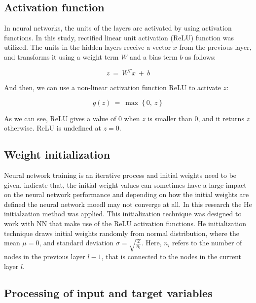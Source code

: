 \documentclass[a4paper, twoside]{templates/ociamthesis}
\begin{document}
\hypertarget{activation-function}{%
\subsection{Activation function}\label{activation-function}}

In neural networks, the units of the layers are activated by using activation functions. In this study, rectified linear unit activation (ReLU) function was utilized. The units in the hidden layers receive a vector \(x\) from the previous layer, and transforms it using a weight term \(W\) and a bias term \(b\) as follows:

\begin{equation}
z\ =\ W^Tx\ +\ b
\label{eq:z}
\end{equation}

And then, we can use a non-linear activation function ReLU to activate \(z\):

\begin{equation}
g\left(z\right)\ =\ \max\left\{0,\ z\right\}
\label{eq:relu}
\end{equation}

As we can see, ReLU gives a value of 0 when \(z\) is smaller than 0, and it returns \(z\) otherwise. ReLU is undefined at \(z = 0\).

\hypertarget{weight-initialization}{%
\subsection{Weight initialization}\label{weight-initialization}}

Neural network training is an iterative process and initial weights need to be given. \citet{goodfellow2016deep} indicate that, the initial weight values can sometimes have a large impact on the neural network performance and depending on how the initial weights are defined the neural network moedl may not converge at all. In this research the He initialzation \citep{he2015delving} method was applied. This initialization technique was designed to work with NN that make use of the ReLU activation functions. He initialization technique draws initial weights randomly from normal distribution, where the mean \(\mu = 0\), and standard deviation \(\sigma = \sqrt{\frac{2}{n_{l}}}\). Here, \(n_{l}\) refers to the number of nodes in the previous layer \(l - 1\), that is connected to the nodes in the current layer \(l\).

\hypertarget{processing-of-input-and-target-variables}{%
\subsection{Processing of input and target variables}\label{processing-of-input-and-target-variables}}
\end{document}

